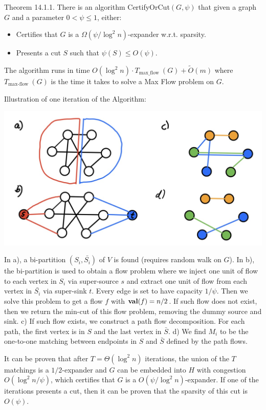 Theorem 14.1.1. There is an algorithm CertifyOrCut$(G, \psi)$ that given a graph $G$ and a parameter $0<\psi \leq 1$, either:
\begin{itemize}
    \item Certifies that $G$ is a $\Omega\left(\psi / \log ^{2} n\right)$-expander w.r.t. sparsity.
    \item Presents a cut $S$ such that $\psi(S) \leq O(\psi)$.
\end{itemize}
The algorithm runs in time $O\left(\log^{2} n\right) \cdot T_{\text {max\_flow }}(G)+\tilde{O}(m)$ where $T_{\text{max-flow }}(G)$ is the time it takes to solve a Max Flow problem on $G$.

Illustration of one iteration of the Algorithm:

\begin{center}
\includegraphics[width=.5\columnwidth]{imgs/cut-match.png}
\end{center}

 In a), a bi-partition $(S_i, \bar{S_i})$ of $V$ is found (requires random walk on $G$). In b), the bi-partition is used to obtain a flow problem where we inject one unit of flow to each vertex in $S_i$ via super-source $s$ and extract one unit of flow from each vertex in $\bar{S_i}$ via super-sink $t$. Every edge is set to have capacity $1/\psi$. Then we solve this problem to get a flow $f$ with $\operatorname{\textbf{val}}(f)=n/2$. If such flow does not exist, then we return the min-cut of this flow problem, removing the dummy source and sink.  c) If such flow exists, we construct a path flow decomposition. For each path, the first vertex is in $S$ and the last vertex in $\bar{S}$. d) We find $M_{i}$ to be the one-to-one matching between endpoints in $S$ and $\bar{S}$ defined by the path flows.

 It can be proven that after $T=\Theta(\log^2 n)$ iterations, the union of the $T$ matchings is a $1/2$-expander and $G$ can be embedded into $H$ with congestion $O(\log^2 n / \psi)$, which certifies that $G$ is a $O(\psi / \log^2 n)$-expander. If one of the iterations presents a cut, then it can be proven that the sparsity of this cut is $O(\psi)$.